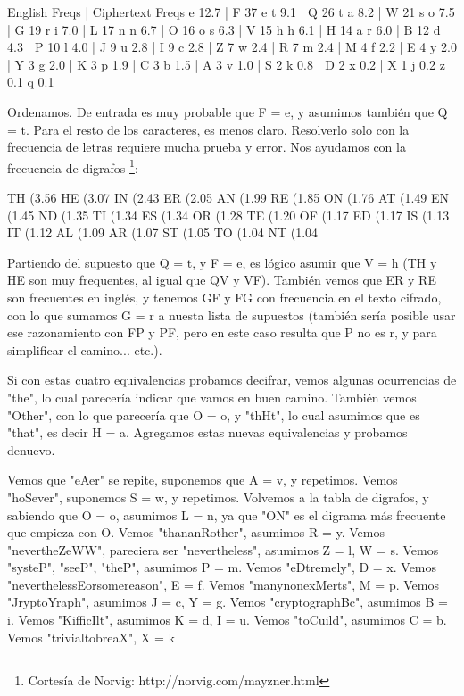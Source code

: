 
English Freqs | Ciphertext Freqs
e   12.7      | F  37   e
t   9.1       | Q  26   t
a   8.2       | W  21   s
o   7.5       | G  19   r
i   7.0       | L  17   n
n   6.7       | O  16   o
s   6.3       | V  15   h
h   6.1       | H  14   a
r   6.0       | B  12
d   4.3       | P  10
l   4.0       | J  9
u   2.8       | I  9
c   2.8       | Z  7
w   2.4       | R  7
m   2.4       | M  4
f   2.2       | E  4
y   2.0       | Y  3
g   2.0       | K  3
p   1.9       | C  3
b   1.5       | A  3
v   1.0       | S  2
k   0.8       | D  2
x   0.2       | X  1
j   0.2
z   0.1
q   0.1

Ordenamos. De entrada es muy probable que F = e, y asumimos también que Q = t.
Para el resto de los caracteres, es menos claro. Resolverlo solo con la
frecuencia de letras requiere mucha prueba y error. Nos ayudamos con la
frecuencia de digrafos \footnote{Cortesía de Norvig:
http://norvig.com/mayzner.html}:

TH  (3.56%
HE  (3.07%
IN  (2.43%
ER  (2.05%
AN  (1.99%
RE  (1.85%
ON  (1.76%
AT  (1.49%
EN  (1.45%
ND  (1.35%
TI  (1.34%
ES  (1.34%
OR  (1.28%
TE  (1.20%
OF  (1.17%
ED  (1.17%
IS  (1.13%
IT  (1.12%
AL  (1.09%
AR  (1.07%
ST  (1.05%
TO  (1.04%
NT  (1.04%

Partiendo del supuesto que Q = t, y F = e, es lógico asumir que V = h (TH y HE
son muy frequentes, al igual que QV y VF). También vemos que ER y RE son
frecuentes en inglés, y tenemos GF y FG con frecuencia en el texto cifrado, con
lo que sumamos G = r a nuesta lista de supuestos (también sería posible usar ese
razonamiento con FP y PF, pero en este caso resulta que P no es r, y para
simplificar el camino... etc.).

Si con estas cuatro equivalencias probamos decifrar, vemos algunas ocurrencias
de "the", lo cual parecería indicar que vamos en buen camino. También vemos
"Other", con lo que parecería que O = o, y "thHt", lo cual asumimos que es
"that", es decir H = a. Agregamos estas nuevas equivalencias y probamos denuevo.

Vemos que "eAer" se repite, suponemos que A = v, y repetimos.
Vemos "hoSever", suponemos S = w, y repetimos.
Volvemos a la tabla de digrafos, y sabiendo que O = o, asumimos L = n, ya que
"ON" es el digrama más frecuente que empieza con O.
Vemos "thananRother", asumimos R = y.
Vemos "nevertheZeWW", pareciera ser "nevertheless", asumimos Z = l, W = s.
Vemos "systeP", "seeP", "theP", asumimos P = m.
Vemos "eDtremely", D = x.
Vemos "neverthelessEorsomereason", E = f.
Vemos "manynonexMerts", M = p.
Vemos "JryptoYraph", asumimos J = c, Y = g.
Vemos "cryptographBc", asumimos B = i.
Vemos "KifficIlt", asumimos K = d, I = u.
Vemos "toCuild", asumimos C = b.
Vemos "trivialtobreaX", X = k

